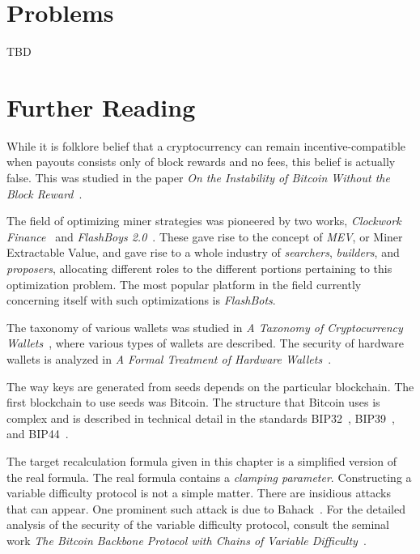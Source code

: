 \section*{Problems}
TBD

\section*{Further Reading}
While it is folklore belief that a cryptocurrency can remain incentive-compatible
when payouts consists only of block rewards and no fees, this belief is actually
false. This was studied in the paper
\emph{On the Instability of Bitcoin Without the Block Reward}~\cite{instability}.

The field of optimizing miner strategies was pioneered by two works,
\emph{Clockwork Finance}~\cite{clockwork} and \emph{FlashBoys 2.0}~\cite{flashboys}.
These gave rise to the concept of \emph{MEV}, or Miner Extractable Value, and
gave rise to a whole industry of \emph{searchers}, \emph{builders}, and \emph{proposers},
allocating different roles to the different portions pertaining to this optimization
problem. The most popular platform in the field currently concerning itself with
such optimizations is \emph{FlashBots}.

The taxonomy of various wallets was studied in
\emph{A Taxonomy of Cryptocurrency Wallets}~\cite{wallet-taxonomy}, where various
types of wallets are described. The security of hardware wallets is analyzed in
\emph{A Formal Treatment of Hardware Wallets}~\cite{hardware-wallets}.

The way keys are generated from seeds depends on the particular blockchain.
The first blockchain to use seeds was Bitcoin. The structure that Bitcoin
uses is complex and is described in technical detail in the standards
BIP32~\cite{bip32}, BIP39~\cite{bip39}, and BIP44~\cite{bip44}.


The target recalculation formula given in this chapter is a simplified
version of the real formula. The real formula contains a \emph{clamping
parameter}. Constructing a variable difficulty protocol is not a simple
matter. There are insidious attacks that can appear. One prominent such
attack is due to Bahack~\cite{bahack}. For the detailed analysis of the
security of the variable difficulty protocol, consult the seminal
work \emph{The Bitcoin Backbone Protocol with Chains of Variable
Difficulty}~\cite{varbackbone}.
